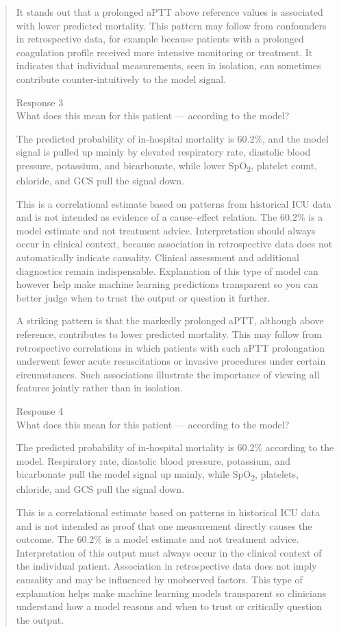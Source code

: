 \documentclass[12pt, a4paper]{article}
\begin{document}
\begin{quote}
It stands out that a prolonged aPTT above reference values is associated with lower predicted mortality. This pattern may follow from confounders in retrospective data, for example because patients with a prolonged coagulation profile received more intensive monitoring or treatment. It indicates that individual measurements, seen in isolation, can sometimes contribute counter-intuitively to the model signal.

Response 3\\
What does this mean for this patient --- according to the model?

The predicted probability of in-hospital mortality is 60.2\%, and the model signal is pulled up mainly by elevated respiratory rate, diastolic blood pressure, potassium, and bicarbonate, while lower SpO\textsubscript{2}, platelet count, chloride, and GCS pull the signal down.

This is a correlational estimate based on patterns from historical ICU data and is not intended as evidence of a cause--effect relation. The 60.2\% is a model estimate and not treatment advice. Interpretation should always occur in clinical context, because association in retrospective data does not automatically indicate causality. Clinical assessment and additional diagnostics remain indispensable. Explanation of this type of model can however help make machine learning predictions transparent so you can better judge when to trust the output or question it further.

A striking pattern is that the markedly prolonged aPTT, although above reference, contributes to lower predicted mortality. This may follow from retrospective correlations in which patients with such aPTT prolongation underwent fewer acute resuscitations or invasive procedures under certain circumstances. Such associations illustrate the importance of viewing all features jointly rather than in isolation.

Response 4\\
What does this mean for this patient --- according to the model?

The predicted probability of in-hospital mortality is 60.2\% according to the model. Respiratory rate, diastolic blood pressure, potassium, and bicarbonate pull the model signal up mainly, while SpO\textsubscript{2}, platelets, chloride, and GCS pull the signal down.

This is a correlational estimate based on patterns in historical ICU data and is not intended as proof that one measurement directly causes the outcome. The 60.2\% is a model estimate and not treatment advice. Interpretation of this output must always occur in the clinical context of the individual patient. Association in retrospective data does not imply causality and may be influenced by unobserved factors. This type of explanation helps make machine learning models transparent so clinicians understand how a model reasons and when to trust or critically question the output.


\end{quote}
\end{document}
